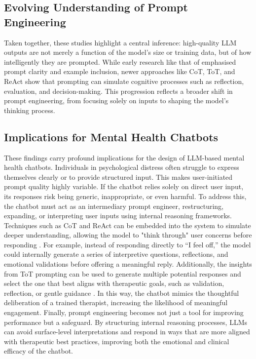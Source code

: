 \subsection{Evolving Understanding of Prompt Engineering} 
Taken together, these studies highlight a central inference: high-quality LLM outputs are not merely a function of the model’s size or training data, but of how intelligently they are prompted. While early research like that of \cite{garg2021transformers, brown2020language} emphasised prompt clarity and example inclusion, newer approaches like CoT, ToT, and ReAct show that prompting can simulate cognitive processes such as reflection, evaluation, and decision-making. This progression reflects a broader shift in prompt engineering, from focusing solely on inputs to shaping the model’s thinking process.


\subsection{Implications for Mental Health Chatbots}
These findings carry profound implications for the design of LLM-based mental health chatbots. Individuals in psychological distress often struggle to express themselves clearly or to provide structured input. This makes user-initiated prompt quality highly variable. If the chatbot relies solely on direct user input, its responses risk being generic, inappropriate, or even harmful.
To address this, the chatbot must act as an intermediary prompt engineer, restructuring, expanding, or interpreting user inputs using internal reasoning frameworks. Techniques such as CoT and ReAct can be embedded into the system to simulate deeper understanding, allowing the model to "think through" user concerns before responding \cite{wang2022self, yao2022react}. For example, instead of responding directly to “I feel off,” the model could internally generate a series of interpretive questions, reflections, and emotional validations before offering a meaningful reply.
Additionally, the insights from ToT prompting can be used to generate multiple potential responses and select the one that best aligns with therapeutic goals, such as validation, reflection, or gentle guidance \cite{yao2023tree}. In this way, the chatbot mimics the thoughtful deliberation of a trained therapist, increasing the likelihood of meaningful engagement.
Finally, prompt engineering becomes not just a tool for improving performance but a safeguard. By structuring internal reasoning processes, LLMs can avoid surface-level interpretations and respond in ways that are more aligned with therapeutic best practices, improving both the emotional and clinical efficacy of the chatbot.